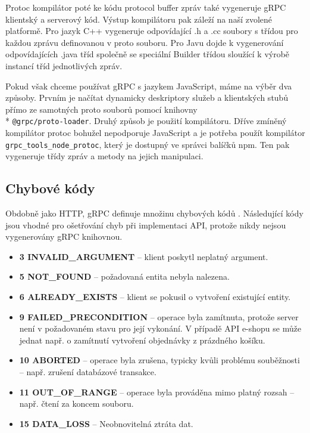 \documentclass[thesis=M,czech]{FITthesis}[2019/12/23]
\begin{document}
Protoc kompilátor poté ke kódu protocol buffer zpráv také vygeneruje gRPC klientský a serverový kód. Výstup kompilátoru pak záleží na naší zvolené platformě. Pro jazyk C++ vygeneruje odpovídající .h a .cc soubory s třídou pro každou zprávu definovanou v proto souboru. Pro Javu dojde k vygenerování odpovídajících .java tříd společně se speciální Builder třídou sloužící k výrobě instancí tříd jednotlivých zpráv.

Pokud však chceme používat gRPC s jazykem JavaScript, máme na výběr dva způsoby. Prvním je načítat dynamicky deskriptory služeb a klientských stubů přímo ze samotných proto souborů pomocí knihovny \\* \texttt{@grpc/proto-loader}.
Druhý způsob je použití kompilátoru. Dříve zmíněný kompilátor protoc bohužel nepodporuje JavaScript a je potřeba použít kompilátor \texttt{grpc_tools_node_protoc}, který je dostupný ve správci balíčků npm. Ten pak vygeneruje třídy zpráv a metody na jejich manipulaci.

\subsection{Chybové kódy}
Obdobně jako HTTP, gRPC definuje množinu chybových kódů \cite{grpc_codes}. Následující kódy jsou vhodné pro ošetřování chyb při implementaci API, protože nikdy nejsou vygenerovány gRPC knihovnou.

\begin{itemize}
  \item \textbf{3 INVALID\_ARGUMENT} -- klient poskytl neplatný argument.
  \item \textbf{5 NOT\_FOUND} -- požadovaná entita nebyla nalezena.
  \item \textbf{6 ALREADY\_EXISTS} -- klient se pokusil o vytvoření existující entity.
  \item \textbf{9 FAILED\_PRECONDITION} -- operace byla zamítnuta, protože server není v požadovaném stavu pro její vykonání. V případě API e-shopu se může jednat např. o zamítnutí vytvoření objednávky z prázdného košíku.
  \item \textbf{10 ABORTED} -- operace byla zrušena, typicky kvůli problému souběžnosti -- např. zrušení databázové transakce.
  \item \textbf{11 OUT\_OF\_RANGE} -- operace byla prováděna mimo platný rozsah -- např. čtení za koncem souboru.
  \item \textbf{15 DATA\_LOSS} -- Neobnovitelná ztráta dat.
\end{itemize}
\end{document}
